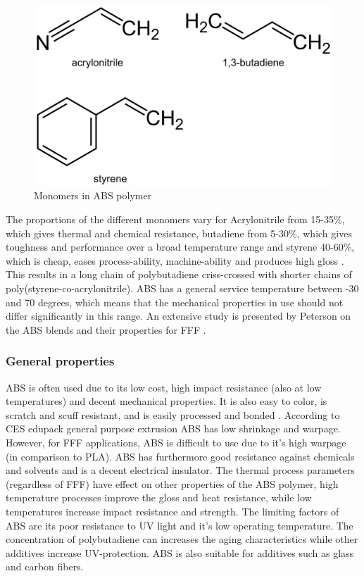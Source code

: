 \begin{figure}[H]
    \centering
    \includegraphics[width=0.\textwidth]{chapter_2/figures/ABSformula.PNG}
    \caption{Monomers in ABS polymer}
    \label{fig:ABSforumla}
\end{figure}
The proportions of the different monomers vary for Acrylonitrile from 15-35\%, which gives thermal and chemical resistance,  butadiene from 5-30\%, which gives toughness and performance over a broad temperature range and styrene 40-60\%, which is cheap, eases process-ability, machine-ability and produces high gloss \cite{GrantaDesignLimited2018CESEdupack}. This results in a long chain of polybutadiene criss-crossed with shorter chains of poly(styrene-co-acrylonitrile). ABS has a general service temperature between -30 and 70 degrees, which means that the mechanical properties in use should not differ significantly in this range. An extensive study is presented by Peterson on the ABS blends and their properties for FFF \cite{Peterson2019ReviewPerspective}.

\subsubsection{General properties}
ABS is often used due to its low cost, high impact resistance (also at low temperatures) and decent mechanical properties. It is also easy to color, is scratch and scuff resistant, and is easily processed and bonded \cite{GrantaDesignLimited2018CESEdupack}. According to CES edupack \cite{GrantaDesignLimited2018CESEdupack} general purpose extrusion ABS has low shrinkage and warpage. However, for FFF applications, ABS is difficult to use due to it's high warpage (in comparison to PLA). ABS has furthermore good resistance against chemicals and  solvents and is a decent electrical insulator. The thermal process parameters (regardless of FFF) have  effect on other properties of the ABS polymer, high temperature processes improve the gloss and heat resistance, while low temperatures increase impact resistance and strength. 
The limiting factors of ABS are its poor resistance to UV light and it's low operating temperature. The concentration of polybutadiene can increases the aging characteristics while other additives increase UV-protection. ABS is also suitable for additives such as glass and carbon fibers. 

